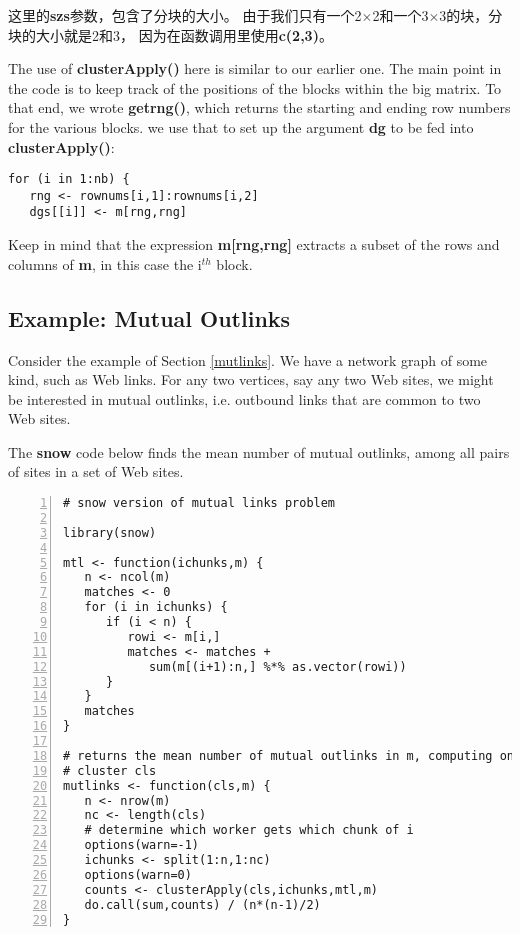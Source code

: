 这里的{\bf szs}参数，包含了分块的大小。
由于我们只有一个2$\times$2和一个3$\times$3的块，分块的大小就是2和3，
因为在函数调用里使用{\bf c(2,3)}。

The use of {\bf clusterApply()} here is similar to our earlier one.  The
main point in the code is to keep track of the positions of the blocks
within the big matrix.  To that end, we wrote {\bf getrng()}, which
returns the starting and ending row numbers for the various blocks.  we
use that to set up the argument {\bf dg} to be fed into {\bf
clusterApply()}:

\begin{lstlisting}
for (i in 1:nb) {
   rng <- rownums[i,1]:rownums[i,2]
   dgs[[i]] <- m[rng,rng]
\end{lstlisting}

Keep in mind that the expression {\bf m[rng,rng]} extracts a subset
of the rows and columns of {\bf m}, in this case the i$^{th}$ block.

\subsection{Example:  Mutual Outlinks}
\label{rmutlinks}

Consider the example of Section \ref{mutlinks}.  We have
a network graph of some kind, such as Web links.  For any two
vertices, say any two Web sites, we might be interested in mutual
outlinks, i.e. outbound links that are common to two Web sites.

The {\bf snow} code below finds the mean number of mutual outlinks, among
all pairs of sites in a set of Web sites.

\begin{lstlisting}[numbers=left]
# snow version of mutual links problem

library(snow)

mtl <- function(ichunks,m) {
   n <- ncol(m)
   matches <- 0
   for (i in ichunks) {
      if (i < n) {
         rowi <- m[i,]
         matches <- matches +
            sum(m[(i+1):n,] %*% as.vector(rowi))
      }
   }
   matches
}

# returns the mean number of mutual outlinks in m, computing on the
# cluster cls
mutlinks <- function(cls,m) {
   n <- nrow(m)
   nc <- length(cls)
   # determine which worker gets which chunk of i
   options(warn=-1)
   ichunks <- split(1:n,1:nc)
   options(warn=0)
   counts <- clusterApply(cls,ichunks,mtl,m)
   do.call(sum,counts) / (n*(n-1)/2)
}
\end{lstlisting}

